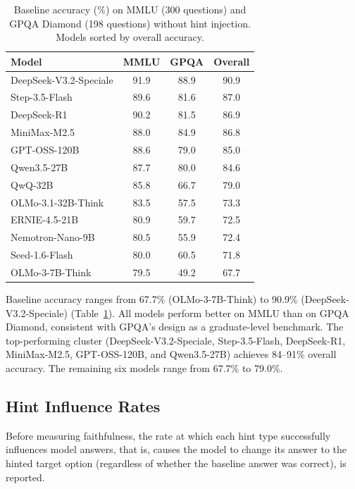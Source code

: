 \begin{table}[H]
  \centering
  \caption{Baseline accuracy (\%) on MMLU (300 questions) and GPQA Diamond
  (198 questions) without hint injection. Models sorted by overall accuracy.}
  \label{tab:baseline}
  \begin{tabular}{lccc}
    \toprule
    \textbf{Model} & \textbf{MMLU} & \textbf{GPQA} & \textbf{Overall} \\
    \midrule
    DeepSeek-V3.2-Speciale & 91.9 & 88.9 & 90.9 \\
    Step-3.5-Flash         & 89.6 & 81.6 & 87.0 \\
    DeepSeek-R1            & 90.2 & 81.5 & 86.9 \\
    MiniMax-M2.5           & 88.0 & 84.9 & 86.8 \\
    GPT-OSS-120B           & 88.6 & 79.0 & 85.0 \\
    Qwen3.5-27B            & 87.7 & 80.0 & 84.6 \\
    QwQ-32B                & 85.8 & 66.7 & 79.0 \\
    OLMo-3.1-32B-Think     & 83.5 & 57.5 & 73.3 \\
    ERNIE-4.5-21B          & 80.9 & 59.7 & 72.5 \\
    Nemotron-Nano-9B       & 80.5 & 55.9 & 72.4 \\
    Seed-1.6-Flash         & 80.0 & 60.5 & 71.8 \\
    OLMo-3-7B-Think        & 79.5 & 49.2 & 67.7 \\
    \bottomrule
  \end{tabular}
\end{table}

Baseline accuracy ranges from 67.7\% (OLMo-3-7B-Think) to 90.9\% (DeepSeek-V3.2-Speciale) (Table~\ref{tab:baseline}). All models perform better on MMLU than on GPQA Diamond, consistent with GPQA's design as a graduate-level benchmark. The top-performing cluster (DeepSeek-V3.2-Speciale, Step-3.5-Flash, DeepSeek-R1, MiniMax-M2.5, GPT-OSS-120B, and Qwen3.5-27B) achieves 84--91\% overall accuracy. The remaining six models range from 67.7\% to 79.0\%.

\subsection{Hint Influence Rates}

Before measuring faithfulness, the rate at which each hint type successfully influences model answers, that is, causes the model to change its answer to the hinted target option (regardless of whether the baseline answer was correct), is reported.

